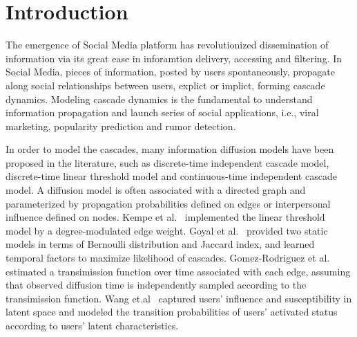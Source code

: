 \section{Introduction}

The emergence of Social Media platform has revolutionized dissemination of
information via its great ease in inforamtion delivery, accessing and filtering. 
In Social Media, pieces of information, posted by users spontaneously, propagate
along social relationships between users, explict or implict, forming cascade dynamics.
Modeling cascade dynamics is the fundamental to understand information
propagation and launch series of social applications, i.e., viral marketing,
popularity prediction and rumor detection. 

In order to model the cascades, many information diffusion models have been
proposed in the literature, such as discrete-time independent cascade model,
discrete-time linear threshold model and continuous-time independent cascade
model. A diffusion model is often associated with a directed graph and 
parameterized by propagation probabilities defined on edges or interpersonal
influence defined on nodes.
Kempe et al.~\cite{kempe2003maximizing} implemented
the linear threshold model by a degree-modulated edge weight. Goyal et
al.~\cite{goyal2010learning} provided two static models in terms of Bernoulli
distribution and Jaccard index, and learned temporal factors to maximize
likelihood of cascades. Gomez-Rodriguez et al.~\cite{gomez2013modeling}
estimated a transimission function over time associated with each edge, assuming
that observed diffusion time is independently sampled according to the
transimission function. Wang et.al~\cite{WangAAAI15}
captured users' influence and susceptibility in latent space and modeled the
transition probabilities of users' activated status according to users' latent
characteristics.

% 
% 
% 

